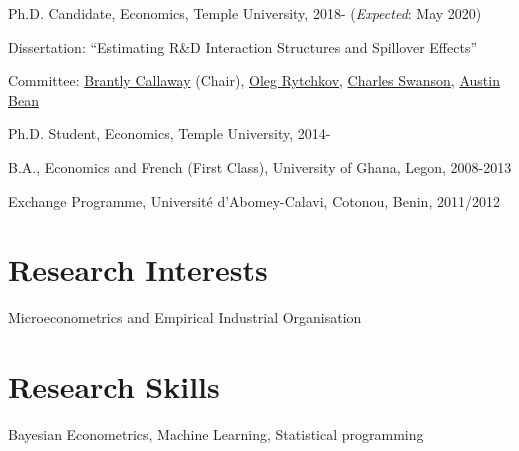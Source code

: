 \documentclass[12pt,letterpaper]{article}
\renewenvironment{itemize}{
  \begin{list}{}{
    \setlength{\leftmargin}{1.5em}
  }
}{
  \end{list}
}
\begin{document}
\begin{itemize}
  \item Ph.D. Candidate, Economics, Temple University, 2018- (\textit{Expected}: May 2020)

  \begin{itemize}
    \item Dissertation: ``Estimating R\&D Interaction Structures and Spillover Effects''
    \item Committee:   \href{https://bcallaway11.github.io/index.html}
    {Brantly Callaway} (Chair), \href{https://astro.temple.edu/~rytchkov/}{Oleg Rytchkov}, \href{https://liberalarts.temple.edu/academics/faculty/swanson-charles}{Charles Swanson}, \href{https://liberalarts.temple.edu/academics/faculty/bean-austin}{Austin Bean} 
  \end{itemize}

	\item Ph.D. Student, Economics, Temple University, 2014-

  \item B.A., Economics and French (First Class), University of Ghana, Legon, 2008-2013
  \item  Exchange Programme, Universit\'{e} d'Abomey-Calavi, Cotonou, Benin, 2011/2012
\end{itemize}

\section*{Research Interests}
\begin{itemize}
  \item Microeconometrics and Empirical Industrial Organisation
\end{itemize}

\section*{Research Skills}
\begin{itemize}
	\item Bayesian Econometrics, Machine Learning, Statistical programming
\end{itemize}
\end{document}
